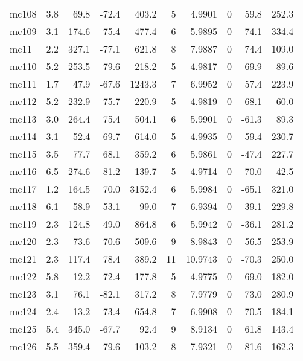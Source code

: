 \documentclass{article}
\begin{document}
\begin{longtable}{lrrrrrrrrr}
 mc108 &  3.8 &   69.8 & -72.4 &   403.2 &   5 &   4.9901 &       0 &     59.8 &     252.3 \\
 mc109 &  3.1 &  174.6 &  75.4 &   477.4 &   6 &   5.9895 &       0 &    -74.1 &     334.4 \\
  mc11 &  2.2 &  327.1 & -77.1 &   621.8 &   8 &   7.9887 &       0 &     74.4 &     109.0 \\
 mc110 &  5.2 &  253.5 &  79.6 &   218.2 &   5 &   4.9817 &       0 &    -69.9 &      89.6 \\
 mc111 &  1.7 &   47.9 & -67.6 &  1243.3 &   7 &   6.9952 &       0 &     57.4 &     223.9 \\
 mc112 &  5.2 &  232.9 &  75.7 &   220.9 &   5 &   4.9819 &       0 &    -68.1 &      60.0 \\
 mc113 &  3.0 &  264.4 &  75.4 &   504.1 &   6 &   5.9901 &       0 &    -61.3 &      89.3 \\
 mc114 &  3.1 &   52.4 & -69.7 &   614.0 &   5 &   4.9935 &       0 &     59.4 &     230.7 \\
 mc115 &  3.5 &   77.7 &  68.1 &   359.2 &   6 &   5.9861 &       0 &    -47.4 &     227.7 \\
 mc116 &  6.5 &  274.6 & -81.2 &   139.7 &   5 &   4.9714 &       0 &     70.0 &      42.5 \\
 mc117 &  1.2 &  164.5 &  70.0 &  3152.4 &   6 &   5.9984 &       0 &    -65.1 &     321.0 \\
 mc118 &  6.1 &   58.9 & -53.1 &    99.0 &   7 &   6.9394 &       0 &     39.1 &     229.8 \\
 mc119 &  2.3 &  124.8 &  49.0 &   864.8 &   6 &   5.9942 &       0 &    -36.1 &     281.2 \\
 mc120 &  2.3 &   73.6 & -70.6 &   509.6 &   9 &   8.9843 &       0 &     56.5 &     253.9 \\
 mc121 &  2.3 &  117.4 &  78.4 &   389.2 &  11 &  10.9743 &       0 &    -70.3 &     250.0 \\
 mc122 &  5.8 &   12.2 & -72.4 &   177.8 &   5 &   4.9775 &       0 &     69.0 &     182.0 \\
 mc123 &  3.1 &   76.1 & -82.1 &   317.2 &   8 &   7.9779 &       0 &     73.0 &     280.9 \\
 mc124 &  2.4 &   13.2 & -73.4 &   654.8 &   7 &   6.9908 &       0 &     70.5 &     184.1 \\
 mc125 &  5.4 &  345.0 & -67.7 &    92.4 &   9 &   8.9134 &       0 &     61.8 &     143.4 \\
 mc126 &  5.5 &  359.4 & -79.6 &   103.2 &   8 &   7.9321 &       0 &     81.6 &     162.3 \\

\end{longtable}
\end{document}
